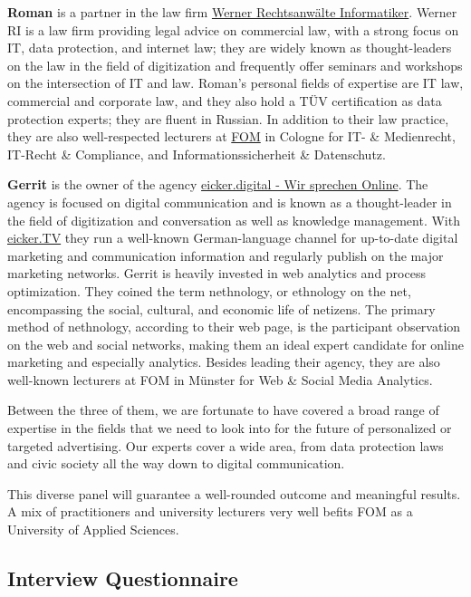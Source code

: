 \textbf{Roman} is a partner in the law firm \href{https://www.werner-ri.de/}{Werner Rechtsanwälte Informatiker}. Werner RI is a law firm providing legal advice on commercial law, with a strong focus on IT, data protection, and internet law; they are widely known as thought-leaders on the law in the field of digitization and frequently offer seminars and workshops on the intersection of IT and law. Roman's personal fields of expertise are IT law, commercial and corporate law, and they also hold a TÜV certification as data protection experts; they are fluent in Russian. In addition to their law practice, they are also well-respected lecturers at \href{https://www.fom.de/}{FOM} in Cologne for IT- \& Medienrecht, IT-Recht \& Compliance, and Informationssicherheit \& Datenschutz.

\textbf{Gerrit} is the owner of the agency \href{https://eicker.digital/}{eicker.digital - Wir sprechen Online}. The agency is focused on digital communication and is known as a thought-leader in the field of digitization and conversation as well as knowledge management. With \href{https://www.youtube.com/eickertv}{eicker.TV} they run a well-known German-language channel for up-to-date digital marketing and communication information and regularly publish on the major marketing networks. Gerrit is heavily invested in web analytics and process optimization. They coined the term nethnology, or ethnology on the net, encompassing the social, cultural, and economic life of netizens. The primary method of nethnology, according to their web page, is the participant observation on the web and social networks, making them an ideal expert candidate for online marketing and especially analytics. Besides leading their agency, they are also well-known lecturers at FOM in Münster for Web \& Social Media Analytics.

Between the three of them, we are fortunate to have covered a broad range of expertise in the fields that we need to look into for the future of personalized or targeted advertising. Our experts cover a wide area, from data protection laws and civic society all the way down to digital communication. 

This diverse panel will guarantee a well-rounded outcome and meaningful results. A mix of practitioners and university lecturers very well befits FOM as a University of Applied Sciences.

\subsection{Interview Questionnaire}

